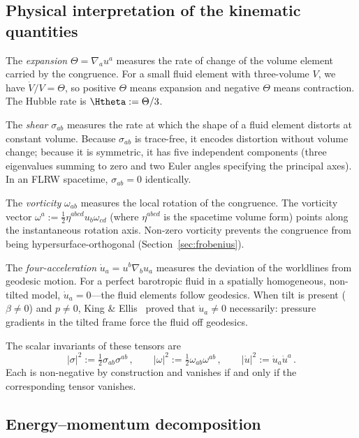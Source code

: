 \subsection{Physical interpretation of the kinematic
  quantities}\label{sec:phys-interp}

The \emph{expansion} $\Theta = \nabla_a u^a$ measures the
rate of change of the volume element carried by the congruence.
For a small fluid element with three-volume $V$, we have
$\dot{V}/V = \Theta$, so positive $\Theta$ means expansion and
negative $\Theta$ means contraction.  The Hubble rate is
$\Htheta := \Theta/3$.

The \emph{shear} $\sigma_{ab}$ measures the rate at which the
shape of a fluid element distorts at constant volume.  Because
$\sigma_{ab}$ is trace-free, it encodes distortion without
volume change; because it is symmetric, it has five independent
components (three eigenvalues summing to zero and two Euler
angles specifying the principal axes).  In an FLRW spacetime,
$\sigma_{ab} = 0$ identically.

The \emph{vorticity} $\omega_{ab}$ measures the local rotation
of the congruence.  The vorticity vector
$\omega^a := \frac{1}{2}\eta^{abcd}u_b\omega_{cd}$ (where
$\eta^{abcd}$ is the spacetime volume form) points along the
instantaneous rotation axis.  Non-zero vorticity prevents the
congruence from being hypersurface-orthogonal
(Section~\ref{sec:frobenius}).

The \emph{four-acceleration} $\dot{u}_a = u^b\nabla_b u_a$
measures the deviation of the worldlines from geodesic motion.
For a perfect barotropic fluid in a spatially homogeneous,
non-tilted model, $\dot{u}_a = 0$---the fluid elements follow
geodesics.  When tilt is present ($\beta \neq 0$) and
$p \neq 0$, King \& Ellis~\cite{KingEllis1973} proved that
$\dot{u}_a \neq 0$ necessarily: pressure gradients in the
tilted frame force the fluid off geodesics.

The scalar invariants of these tensors are
\begin{equation}\label{eq:scalar-invariants}
|\sigma|^2 := \tfrac{1}{2}\sigma_{ab}\sigma^{ab}\,,\qquad
|\omega|^2 := \tfrac{1}{2}\omega_{ab}\omega^{ab}\,,\qquad
|\dot{u}|^2 := \dot{u}_a\dot{u}^a\,.
\end{equation}
Each is non-negative by construction and vanishes if and only if
the corresponding tensor vanishes.


\subsection{Energy--momentum decomposition}\label{sec:em-decomp}


